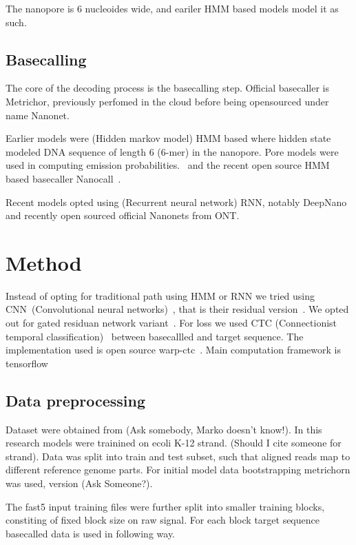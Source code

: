 \documentclass[times, utf8, seminar, numeric]{fer}
\begin{document}
The nanopore is 6 nucleoides wide, and eariler HMM based models model it as such.

\section{Basecalling}

The core of the decoding process is the basecalling step. Official basecaller is Metrichor, previously perfomed in the cloud before being opensourced under name Nanonet.

Earlier models were (Hidden markov model) HMM based where hidden state modeled DNA sequence of length 6 (6-mer) in the nanopore. Pore models were used in computing emission probabilities.~\cite{loman2015complete,schreiber2015analysis,szalay2015novo,timp2012dna} and the recent open source HMM based basecaller Nanocall~\cite{david2016nanocall}.

Recent models opted using (Recurrent neural network) RNN, notably DeepNano~\cite{deepnano} and recently open sourced official Nanonets from ONT.

\chapter{Method}

Instead of opting for traditional path using HMM or RNN we tried using CNN~(Convolutional neural networks)~\cite{lecun-98}, that is their residual version~\cite{he2016deep}. We opted out for gated residuan network variant~\cite{savarese2016learning}. For loss we used CTC (Connectionist temporal classification)~\cite{graves2006connectionist} between basecallled and target sequence. The implementation used is open source warp-ctc~\cite{warpctc}. Main computation framework is tensorflow~\cite{tensorflow2015-whitepaper}

\section{Data preprocessing}

Dataset were obtained from (Ask somebody, Marko doesn't know!). In this research models were trainined on ecoli K-12 strand. (Should I cite someone for strand). Data was split into train and test subset, such that aligned reads map to different reference genome parts. For initial model data bootstrapping metrichorn was used, version (Ask Someone?).

The fast5 input training files were further split into smaller training blocks, constiting of fixed block size on raw signal. For each block target sequence basecalled data is used in following way.
\end{document}
